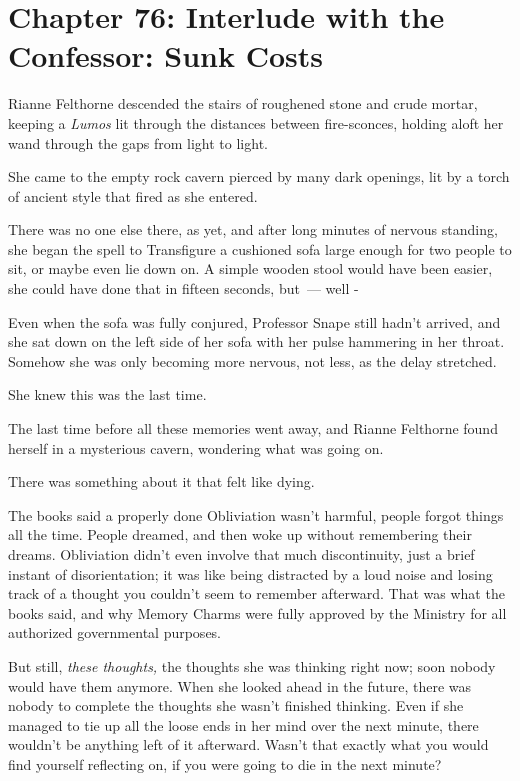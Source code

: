 \chapter{Chapter 76: Interlude with the Confessor: Sunk Costs}
Rianne Felthorne descended the stairs of roughened stone and crude mortar, keeping a \emph{Lumos} lit through the distances between fire-sconces, holding aloft her wand through the gaps from light to light.

She came to the empty rock cavern pierced by many dark openings, lit by a torch of ancient style that fired as she entered.

There was no one else there, as yet, and after long minutes of nervous standing, she began the spell to Transfigure a cushioned sofa large enough for two people to sit, or maybe even lie down on. A simple wooden stool would have been easier, she could have done that in fifteen seconds, but~--- well -

Even when the sofa was fully conjured, Professor Snape still hadn't arrived, and she sat down on the left side of her sofa with her pulse hammering in her throat. Somehow she was only becoming more nervous, not less, as the delay stretched.

She knew this was the last time.

The last time before all these memories went away, and Rianne Felthorne found herself in a mysterious cavern, wondering what was going on.

There was something about it that felt like dying.

The books said a properly done Obliviation wasn't harmful, people forgot things all the time. People dreamed, and then woke up without remembering their dreams. Obliviation didn't even involve that much discontinuity, just a brief instant of disorientation; it was like being distracted by a loud noise and losing track of a thought you couldn't seem to remember afterward. That was what the books said, and why Memory Charms were fully approved by the Ministry for all authorized governmental purposes.

But still, \emph{these thoughts,} the thoughts she was thinking right now; soon nobody would have them anymore. When she looked ahead in the future, there was nobody to complete the thoughts she wasn't finished thinking. Even if she managed to tie up all the loose ends in her mind over the next minute, there wouldn't be anything left of it afterward. Wasn't that exactly what you would find yourself reflecting on, if you were going to die in the next minute?

